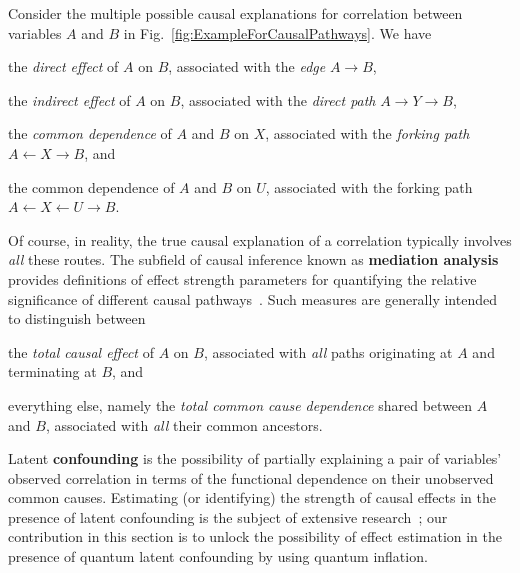 \documentclass[superscriptaddress,aps,prx,nofootinbib,twocolumn,twoside,reprint,letterpaper,longbibliography]{revtex4-2}
\newcommand{\term}[1]{\textcolor{medblue}{\textbf{#1}}}
\begin{document}
Consider the multiple possible causal explanations for correlation between variables $A$ and $B$ in Fig.~\ref{fig:ExampleForCausalPathways}. We have
{\setlength{\parindent}{0em}
\begin{compactitem}[\textbullet\hspace{1em}]
    \item the \emph{direct effect} of $A$ on $B$, associated with the \emph{edge} ${A\to B}$,
    \item the \emph{indirect effect} of $A$ on $B$, associated with the \emph{direct path} ${A\to Y\to B}$,
    \item the \emph{common dependence} of $A$ and $B$ on $X$, associated with the \emph{forking path} ${A\leftarrow X\to B}$, and
    \item the common dependence of $A$ and $B$ on $U$, associated with the forking path ${A\leftarrow X\leftarrow U\to B}$.
\end{compactitem}
}

Of course, in reality, the true causal explanation of a correlation typically involves \emph{all} these routes.  The subfield of causal inference known as \term{mediation analysis} provides definitions of effect strength parameters for quantifying the relative significance of different causal pathways~\cite{janzing2013,miles2015partial,malinsky2019potential,bhattacharya2020semiparametric}. Such measures are generally intended to distinguish between
\begin{compactitem}[\textbullet\hspace{1em}]
    \item the \emph{total causal effect} of $A$ on $B$, associated with \emph{all} paths originating at $A$ and terminating at $B$, and
    \item everything else, namely the \emph{total common cause dependence} shared between $A$ and $B$, associated with \emph{all} their common ancestors.
\end{compactitem}
Latent \term{confounding} is the possibility of partially explaining a pair of variables' observed correlation in terms of the functional dependence on their unobserved common causes. Estimating (or identifying) the strength of causal effects in the presence of latent confounding is the subject of extensive research~\cite{shpitser2016,shpitser2018identification,stensrud2019separable,malinsky2019potential,bhattacharya2020semiparametric,Cai2007,kang2012inequality,miles2015partial}; our contribution in this section is to unlock the possibility of effect estimation in the presence of quantum latent confounding by using quantum inflation.
\end{document}
